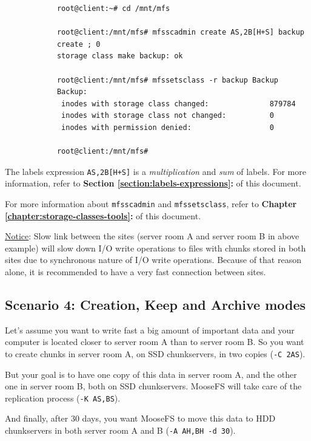 \documentclass[a4paper,11pt,english]{report}
\def\code#1{\texttt{#1}}
\begin{document}
			\begin{lstlisting}
			root@client:~# cd /mnt/mfs
			
			root@client:/mnt/mfs# mfsscadmin create AS,2B[H+S] backup
			create ; 0
			storage class make backup: ok
			
			root@client:/mnt/mfs# mfssetsclass -r backup Backup
			Backup:
			 inodes with storage class changed:              879784
			 inodes with storage class not changed:          0
			 inodes with permission denied:                  0
			 
			root@client:/mnt/mfs#
			\end{lstlisting}
			
			The labels expression \code{AS,2B[H+S]} is a \textit{multiplication} and \textit{sum} of labels. For more information, refer to \textbf{Section \ref{section:labels-expressions}:  } of this document.
			
			
			\bigskip
	
			For more information about \code{mfsscadmin} and \code{mfssetsclass}, refer to \textbf{Chapter \ref{chapter:storage-classes-tools}: } of this document.
	
			\underline{Notice}: Slow link between the sites (server room A and server room B in above example) will slow down I/O write operations to files with chunks stored in both sites due to synchronous nature of I/O write operations. Because of that reason alone, it is recommended to have a very fast connection between sites.
	
			
			\subsection{Scenario 4: Creation, Keep and Archive modes}
	
			Let's assume you want to write fast a big amount of important data and your computer is located closer to server room A than to server room B. So you want to create chunks in server room A, on SSD chunkservers, in two copies (\code{-C 2AS}).
	
			But your goal is to have one copy of this data in server room A, and the other one in server room B, both on SSD chunkservers. MooseFS will take care of the replication process (\code{-K AS,BS}).
			
			And finally, after 30 days, you want MooseFS to move this data to HDD chunkservers in both server room A and B (\code{-A AH,BH -d 30}).
			
\end{document}
